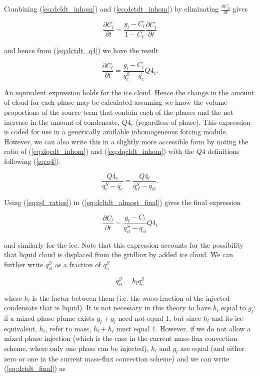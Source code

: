 \documentclass{UMDP_article}
\begin{document}
Combining (\ref{eq:dcldt_inhom}) and (\ref{eq:dctdt_inhom}) by eliminating
$\frac{\partial{C_S}}{\partial{t}}$ gives

\begin{equation}
\frac{\partial{C_l}}{\partial{t}} = \frac{g_l - C_l}{1 - C_t}
\frac{\partial{C_t}}{\partial{t}}
\label{eq:dctdt_dcdt}
\end{equation}

and hence from (\ref{eq:dctdt_q4}) we have the result

\begin{equation}
\frac{\partial{C_l}}{\partial{t}} =
\frac{g_l - C_l}{q_c^S - \overline{q_{c}}} Q4_c .
\label{eq:dcltdt_almost_final}
\end{equation}

An equivalent expression holds for the ice cloud. Hence the change in the
amount of cloud for each phase may be calculated assuming we know
the volume proportions of the source term that contain each of
the phases and the net increase in the amount of condensate, $Q4_c$
(regardless of phase). This expression is coded for use in
a generically available inhomogeneous forcing module. However,
we can also write this in a slightly more
accessible form by noting the ratio of (\ref{eq:dqcdt_inhom}) and
(\ref{eq:dqcldt_inhom}) with the $Q4$ definitions following (\ref{eq:q4}).

\begin{equation}
\frac{Q4_c}{q_c^S - \overline{q_c}} =
\frac{Q4_l}{q_{cl}^S - \overline{q_{cl}}} .
\label{eq:q4_ratios}
\end{equation}

Using (\ref{eq:q4_ratios}) in
(\ref{eq:dcltdt_almost_final}) gives the final expression

\begin{equation}
\frac{\partial{C_l}}{\partial{t}} =
\frac{g_l - C_l}{q_{cl}^S - \overline{q_{cl}}} Q4_l
\label{eq:dctdt_final}
\end{equation}

and similarly for the ice. Note that this expression accounts
for the possibility that liquid cloud is displaced from the
gridbox by added ice cloud. We can further write
$q_{cl}^S$ as a fraction of $q_{c}^S$

\begin{equation}
q_{cl}^S = h_l q_{c}^S
\label{eq:qcls_qcs}
\end{equation}

where $h_l$ is the factor between them (i.e. the \textit{mass} fraction
of the injected condensate that is liquid). It is not necessary
in this theory to have $h_l$ equal to $g_l$: if a mixed
phase plume exists $g_l + g_i$ need not equal 1, but since
$h_l$ and its ice equivalent, $h_i$, refer to mass, $h_l + h_i$
must equal 1. However, if we do not allow a mixed phase injection
(which is the case in the current mass-flux convection
scheme, where only one phase can be injected), $h_l$ and $g_l$ are equal (and either zero or one in the
current mass-flux convection scheme) and we can write (\ref{eq:dctdt_final}) as
\end{document}
